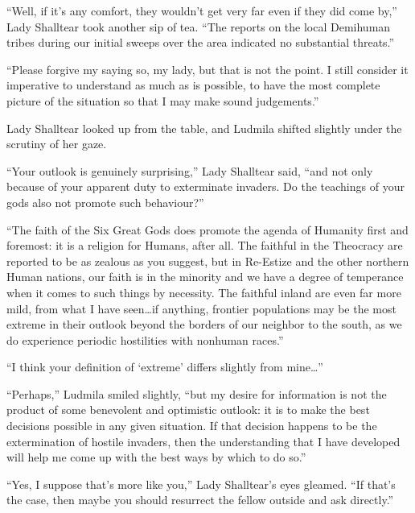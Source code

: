  

“Well, if it’s any comfort, they wouldn’t get very far even if they did come by,” Lady Shalltear took another sip of tea. “The reports on the local Demihuman tribes during our initial sweeps over the area indicated no substantial threats.”

 

“Please forgive my saying so, my lady, but that is not the point. I still consider it imperative to understand as much as is possible, to have the most complete picture of the situation so that I may make sound judgements.”

 

Lady Shalltear looked up from the table, and Ludmila shifted slightly under the scrutiny of her gaze.

 

“Your outlook is genuinely surprising,” Lady Shalltear said, “and not only because of your apparent duty to exterminate invaders. Do the teachings of your gods also not promote such behaviour?”

 

“The faith of the Six Great Gods does promote the agenda of Humanity first and foremost: it is a religion for Humans, after all. The faithful in the Theocracy are reported to be as zealous as you suggest, but in Re-Estize and the other northern Human nations, our faith is in the minority and we have a degree of temperance when it comes to such things by necessity. The faithful inland are even far more mild, from what I have seen…if anything, frontier populations may be the most extreme in their outlook beyond the borders of our neighbor to the south, as we do experience periodic hostilities with nonhuman races.”

 

“I think your definition of ‘extreme’ differs slightly from mine…”

 

“Perhaps,” Ludmila smiled slightly, “but my desire for information is not the product of some benevolent and optimistic outlook: it is to make the best decisions possible in any given situation. If that decision happens to be the extermination of hostile invaders, then the understanding that I have developed will help me come up with the best ways by which to do so.”

 

“Yes, I suppose that’s more like you,” Lady Shalltear’s eyes gleamed. “If that’s the case, then maybe you should resurrect the fellow outside and ask directly.”

